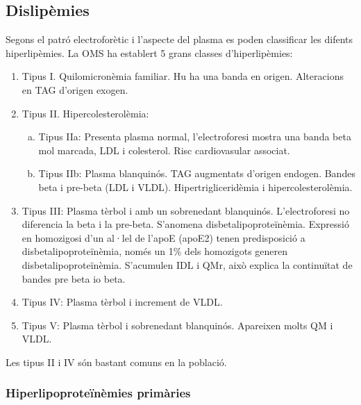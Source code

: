 \subsection{Dislipèmies}
\label{sec:dislipemies}
Segons el patró electroforètic i l'aspecte del plasma es poden
classificar les difents hiperlipèmies. La OMS ha establert 5 grans
classes d'hiperlipèmies:
\begin{enumerate}[label=\itembolasrojas{\arabic*}]
\item Tipus I. Quilomicronèmia familiar. Hu ha una banda en
  origen. Alteracions en TAG d'origen exogen.

\item Tipus II. Hipercolesterolèmia:
  \begin{enumerate}[a)]
  \item Tipus IIa: Presenta plasma normal, l'electroforesi mostra una
    banda beta mol marcada, LDL i colesterol. Risc cardiovasular
    associat.
  \item Tipus IIb: Plasma blanquinós. TAG augmentats d'origen
    endogen. Bandes beta i pre-beta (LDL i VLDL). Hipertrigliceridèmia
    i hipercolesterolèmia.
  \end{enumerate}

\item Tipus III: Plasma tèrbol i amb un sobrenedant
  blanquinós. L'electroforesi no diferencia la beta i la
  pre-beta. S'anomena disbetalipoproteïnèmia. Expressió en homozigosi
  d'un al·lel de l'apoE (apoE2) tenen predisposició a
  disbetalipoproteïnèmia, només un 1\% dels homozigots generen
  disbetalipoproteïnèmia. S'acumulen IDL i QMr, això explica la
  continuïtat de bandes pre beta io beta.

\item Tipus IV: Plasma tèrbol i increment de VLDL.

\item Tipus V: Plasma tèrbol i sobrenedant blanquinós. Apareixen molts
  QM i VLDL.
\end{enumerate}

Les tipus II i IV són bastant comuns en la població.

\subsubsection{Hiperlipoproteïnèmies primàries}
\label{sec:hiperl-prim}

